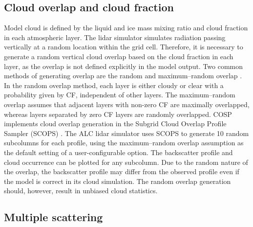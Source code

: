 \subsection{Cloud overlap and cloud fraction}

Model cloud is defined by the liquid and ice mass mixing ratio and cloud
fraction in each atmospheric layer. The lidar simulator simulates radiation
passing vertically at a random location within the grid cell. Therefore,
it is necessary to generate a random vertical cloud overlap based on the cloud
fraction in each layer, as the overlap is not defined explicitly in the model output.
Two common methods of generating overlap are the
random and maximum--random overlap \citep{geleyn1979}. In the random overlap method,
each layer is either cloudy or clear with
a probability given by CF, independent of other layers.
The maximum--random overlap assumes that adjacent layers with non-zero CF are maximally
overlapped, whereas layers separated by zero CF layers are randomly overlapped.
COSP implements cloud overlap generation in the
Subgrid Cloud Overlap Profile Sampler (SCOPS)
\citep{klein1999,webb2001,chepfer2008}. The ALC lidar simulator uses SCOPS to
generate 10 random subcolumns for each profile, using the maximum--random
overlap assumption as the default setting of a user-configurable option.
The backscatter profile and cloud occurrence can be plotted for any subcolumn.
Due to the random nature of the overlap, the backscatter profile may differ
from the observed profile even if the model is correct in its cloud simulation.
The random overlap generation should, however, result in unbiased cloud
statistics.

\subsection{Multiple scattering}

